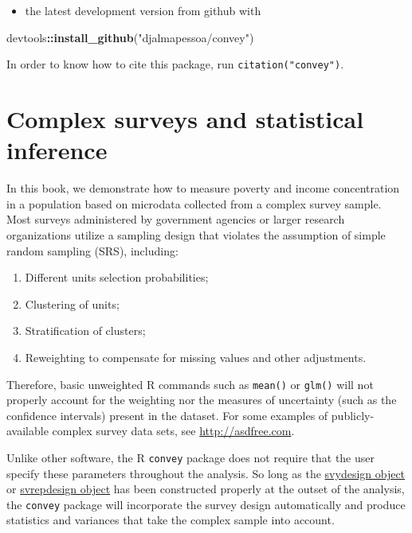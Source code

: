 \documentclass[]{book}
\newenvironment{Shaded}{\begin{snugshade}}{\end{snugshade}}
\newcommand{\KeywordTok}[1]{\textcolor[rgb]{0.13,0.29,0.53}{\textbf{#1}}}
\newcommand{\NormalTok}[1]{#1}
\newcommand{\OperatorTok}[1]{\textcolor[rgb]{0.81,0.36,0.00}{\textbf{#1}}}
\newcommand{\StringTok}[1]{\textcolor[rgb]{0.31,0.60,0.02}{#1}}
\providecommand{\tightlist}{%
  \setlength{\itemsep}{0pt}\setlength{\parskip}{0pt}}
\begin{document}
\begin{itemize}
\tightlist
\item
  the latest development version from github with
\end{itemize}

\begin{Shaded}
\begin{Highlighting}[]
\NormalTok{devtools}\OperatorTok{::}\KeywordTok{install_github}\NormalTok{(}\StringTok{"djalmapessoa/convey"}\NormalTok{)}
\end{Highlighting}
\end{Shaded}

In order to know how to cite this package, run \texttt{citation("convey")}.

\hypertarget{survey}{%
\section{Complex surveys and statistical inference}\label{survey}}

In this book, we demonstrate how to measure poverty and income concentration in a population based on microdata collected from a complex survey sample. Most surveys administered by government agencies or larger research organizations utilize a sampling design that violates the assumption of simple random sampling (SRS), including:

\begin{enumerate}
\def\labelenumi{\arabic{enumi}.}
\tightlist
\item
  Different units selection probabilities;
\item
  Clustering of units;
\item
  Stratification of clusters;
\item
  Reweighting to compensate for missing values and other adjustments.
\end{enumerate}

Therefore, basic unweighted R commands such as \texttt{mean()} or \texttt{glm()} will not properly account for the weighting nor the measures of uncertainty (such as the confidence intervals) present in the dataset. For some examples of publicly-available complex survey data sets, see \href{}{http://asdfree.com}.

Unlike other software, the R \texttt{convey} package does not require that the user specify these parameters throughout the analysis. So long as the \href{http://r-survey.r-forge.r-project.org/survey/html/svydesign.html}{svydesign object} or \href{http://r-survey.r-forge.r-project.org/survey/html/svrepdesign.html}{svrepdesign object} has been constructed properly at the outset of the analysis, the \texttt{convey} package will incorporate the survey design automatically and produce statistics and variances that take the complex sample into account.
\end{document}
